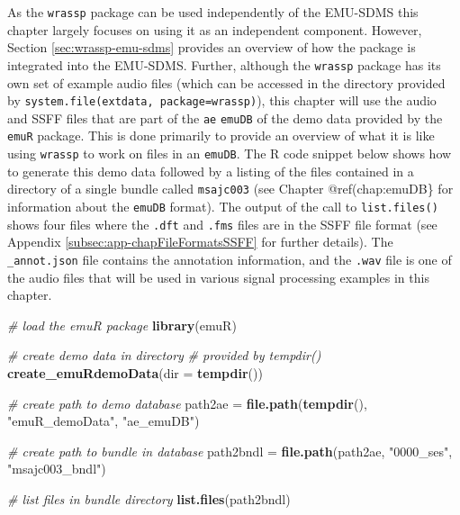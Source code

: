 \documentclass[]{book}
\newenvironment{Shaded}{\begin{snugshade}}{\end{snugshade}}
\newcommand{\CommentTok}[1]{\textcolor[rgb]{0.56,0.35,0.01}{\textit{#1}}}
\newcommand{\DataTypeTok}[1]{\textcolor[rgb]{0.13,0.29,0.53}{#1}}
\newcommand{\KeywordTok}[1]{\textcolor[rgb]{0.13,0.29,0.53}{\textbf{#1}}}
\newcommand{\NormalTok}[1]{#1}
\newcommand{\StringTok}[1]{\textcolor[rgb]{0.31,0.60,0.02}{#1}}
\theoremstyle{definition}
\theoremstyle{definition}
\theoremstyle{definition}
\theoremstyle{remark}
\begin{document}
As the \texttt{wrassp} package can be used independently of the EMU-SDMS
this chapter largely focuses on using it as an independent component.
However, Section \ref{sec:wrassp-emu-sdms} provides an overview of how
the package is integrated into the EMU-SDMS. Further, although the
\texttt{wrassp} package has its own set of example audio files (which
can be accessed in the directory provided by
\texttt{system.file(\textquotesingle{}extdata\textquotesingle{},\ package=\textquotesingle{}wrassp\textquotesingle{})}),
this chapter will use the audio and SSFF files that are part of the
\texttt{ae} \texttt{emuDB} of the demo data provided by the
\texttt{emuR} package. This is done primarily to provide an overview of
what it is like using \texttt{wrassp} to work on files in an
\texttt{emuDB}. The R code snippet below shows how to generate this demo
data followed by a listing of the files contained in a directory of a
single bundle called \texttt{msajc003} (see Chapter @ref(chap:emuDB\}
for information about the \texttt{emuDB} format). The output of the call
to \texttt{list.files()} shows four files where the \texttt{.dft} and
\texttt{.fms} files are in the SSFF file format (see Appendix
\ref{subsec:app-chapFileFormatsSSFF} for further details). The
\texttt{\_annot.json} file contains the annotation information, and the
\texttt{.wav} file is one of the audio files that will be used in
various signal processing examples in this chapter.

\begin{Shaded}
\begin{Highlighting}[]
\CommentTok{# load the emuR package}
\KeywordTok{library}\NormalTok{(emuR)}

\CommentTok{# create demo data in directory}
\CommentTok{# provided by tempdir()}
\KeywordTok{create_emuRdemoData}\NormalTok{(}\DataTypeTok{dir =} \KeywordTok{tempdir}\NormalTok{())}

\CommentTok{# create path to demo database}
\NormalTok{path2ae =}\StringTok{ }\KeywordTok{file.path}\NormalTok{(}\KeywordTok{tempdir}\NormalTok{(), }\StringTok{"emuR_demoData"}\NormalTok{, }\StringTok{"ae_emuDB"}\NormalTok{)}

\CommentTok{# create path to bundle in database}
\NormalTok{path2bndl =}\StringTok{ }\KeywordTok{file.path}\NormalTok{(path2ae, }\StringTok{"0000_ses"}\NormalTok{, }\StringTok{"msajc003_bndl"}\NormalTok{)}

\CommentTok{# list files in bundle directory}
\KeywordTok{list.files}\NormalTok{(path2bndl)}
\end{Highlighting}
\end{Shaded}
\end{document}
